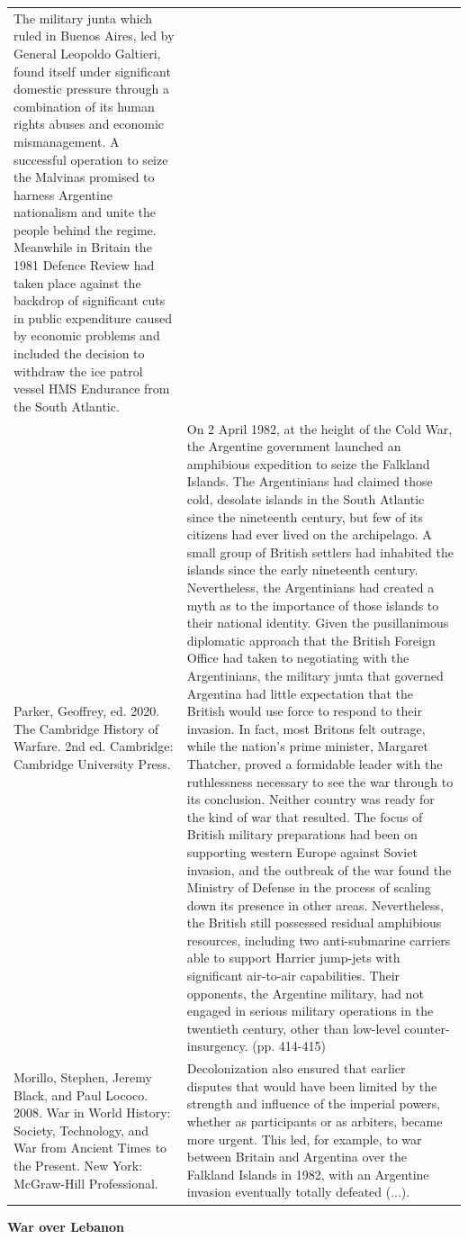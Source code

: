 {\begin{longtable}{p{}p{}}
The military junta which ruled in Buenos Aires, led by General Leopoldo Galtieri, found itself under significant domestic pressure through a combination of its human rights abuses and economic mismanagement. A successful operation to seize the Malvinas promised to harness Argentine nationalism and unite the people behind the regime. Meanwhile in Britain the 1981 Defence Review had taken place against the backdrop of significant cuts in public expenditure caused by economic problems and included the decision to withdraw the ice patrol vessel HMS Endurance from the South Atlantic.
\\
Parker, Geoffrey, ed. 2020. The Cambridge History of Warfare. 2nd ed. Cambridge: Cambridge University Press. & On 2 April 1982, at the height of the Cold War, the Argentine government launched an amphibious expedition to seize the Falkland Islands. The Argentinians had claimed those cold, desolate islands in the South Atlantic since the nineteenth century, but few of its citizens had ever lived on the archipelago. A small group of British settlers had inhabited the islands since the early nineteenth century. Nevertheless, the Argentinians had created a myth as to the importance of those islands to their national identity. Given the pusillanimous diplomatic approach that the British Foreign Office had taken to negotiating with the Argentinians, the military junta that governed Argentina had little expectation that the British would use force to respond to their invasion. In fact, most Britons felt outrage, while the nation's prime minister, Margaret Thatcher, proved a formidable leader with the ruthlessness necessary to see the war through to its conclusion. Neither country was ready for the kind of war that resulted. The focus of British military preparations had been on supporting western Europe against Soviet invasion, and the outbreak of the war found the Ministry of Defense in the process of scaling down its presence in other areas. Nevertheless, the British still possessed residual amphibious resources, including two anti-submarine carriers able to support Harrier jump-jets with significant air-to-air capabilities. Their opponents, the Argentine military, had not engaged in serious military operations in the twentieth century, other than low-level counter-insurgency. (pp. 414-415)
\\
Morillo, Stephen, Jeremy Black, and Paul Lococo. 2008. War in World History: Society, Technology, and War from Ancient Times to the Present. New York: McGraw-Hill Professional. & Decolonization also ensured that earlier disputes that would have been limited by the strength and influence of the imperial powers, whether as participants or as arbiters, became more urgent. This led, for example, to war between Britain and Argentina over the Falkland Islands in 1982, with an Argentine invasion eventually totally defeated (...).
\\
\end{longtable}}
\clearpage
         \textbf{War over Lebanon} 

